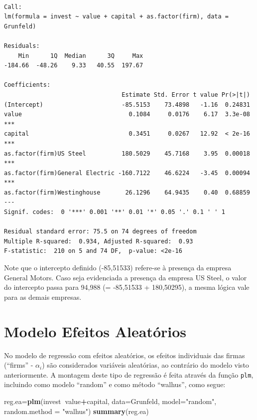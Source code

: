 \documentclass[12pt,brazil,oneside]{book}
\newenvironment{Shaded}{\begin{snugshade}}{\end{snugshade}}
\newcommand{\DataTypeTok}[1]{\textcolor[rgb]{0.13,0.29,0.53}{#1}}
\newcommand{\KeywordTok}[1]{\textcolor[rgb]{0.13,0.29,0.53}{\textbf{#1}}}
\newcommand{\NormalTok}[1]{#1}
\newcommand{\OperatorTok}[1]{\textcolor[rgb]{0.81,0.36,0.00}{\textbf{#1}}}
\newcommand{\StringTok}[1]{\textcolor[rgb]{0.31,0.60,0.02}{#1}}
\begin{document}
\begin{verbatim}

Call:
lm(formula = invest ~ value + capital + as.factor(firm), data = Grunfeld)

Residuals:
    Min      1Q  Median      3Q     Max 
-184.66  -48.26    9.33   40.55  197.67 

Coefficients:
                                 Estimate Std. Error t value Pr(>|t|)    
(Intercept)                      -85.5153    73.4898   -1.16  0.24831    
value                              0.1084     0.0176    6.17  3.3e-08 ***
capital                            0.3451     0.0267   12.92  < 2e-16 ***
as.factor(firm)US Steel          180.5029    45.7168    3.95  0.00018 ***
as.factor(firm)General Electric -160.7122    46.6224   -3.45  0.00094 ***
as.factor(firm)Westinghouse       26.1296    64.9435    0.40  0.68859    
---
Signif. codes:  0 '***' 0.001 '**' 0.01 '*' 0.05 '.' 0.1 ' ' 1

Residual standard error: 75.5 on 74 degrees of freedom
Multiple R-squared:  0.934, Adjusted R-squared:  0.93 
F-statistic:  210 on 5 and 74 DF,  p-value: <2e-16
\end{verbatim}

Note que o intercepto definido (-85,51533) refere-se à presença da
empresa General Motors. Caso seja evidenciada a presença da empresa US
Steel, o valor do intercepto passa para 94,988 (= -85,51533 +
180,50295), a mesma lógica vale para as demais empresas.

\hypertarget{modelo-efeitos-aleatorios}{%
\section{Modelo Efeitos Aleatórios}\label{modelo-efeitos-aleatorios}}

No modelo de regressão com efeitos aleatórios, os efeitos individuais
das firmas (``firms'' - \(\alpha_i\)) são considerados variáveis
aleatórias, ao contrário do modelo visto anteriormente. A montagem deste
tipo de regressão é feita através da função \texttt{plm}, incluindo como
modelo ``random'' e como método ``walhus'', como segue:

\begin{Shaded}
\begin{Highlighting}[]
\NormalTok{reg.ea=}\KeywordTok{plm}\NormalTok{(invest}\OperatorTok{~}\NormalTok{value}\OperatorTok{+}\NormalTok{capital,}
           \DataTypeTok{data=}\NormalTok{Grunfeld, }\DataTypeTok{model=}\StringTok{"random"}\NormalTok{, }
           \DataTypeTok{random.method =} \StringTok{"walhus"}\NormalTok{)}
\KeywordTok{summary}\NormalTok{(reg.ea)}
\end{Highlighting}
\end{Shaded}
\end{document}
